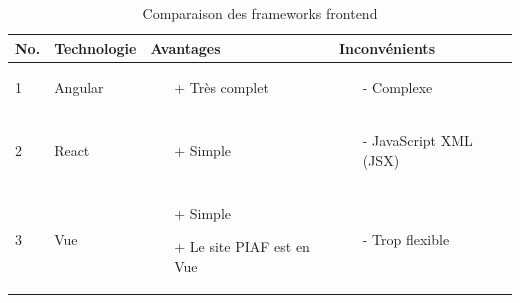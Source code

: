 \documentclass[
    iai, %
    eai, %
]{heig-tb}
\begin{document}
\begin{table}[h]
  \begin{center}
    \caption{Comparaison des frameworks frontend \label{specification}}
    \begin{tabularx}{\textwidth}{|m{1cm} |m{2cm} |m{4cm} |m{4cm}|}
      No. & Technologie & Avantages                  & Inconvénients \\ \toprule
      1   & Angular     & \begin{itemize}
        \item[+] Très complet
      \end{itemize} & 
      \begin{itemize}
        \item[-] Complexe
      \end{itemize}                                     \\ \midrule
      2   & React       & \begin{itemize}
        \item[+] Simple
      \end{itemize} & 
      \begin{itemize}
        \item[-] JavaScript XML (JSX)
      \end{itemize}                                     \\ \midrule
      3   & Vue         & \begin{itemize}
        \item[+] Simple
        \item[+] Le site PIAF est en Vue
      \end{itemize} & 
      \begin{itemize}
        \item[-] Trop flexible
      \end{itemize}                                     \\ \midrule
    \end{tabularx}
  \end{center}
\end{table}
\end{document}
